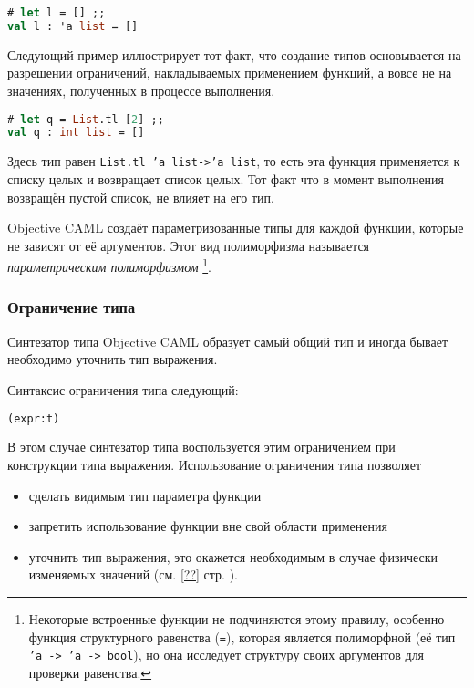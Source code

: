 \begin{lstlisting}[language=OCaml]
# let l = [] ;;
val l : 'a list = []
\end{lstlisting}

Следующий пример иллюстрирует тот факт, что создание типов основывается на
разрешении ограничений, накладываемых применением функций, а вовсе не на
значениях, полученных в процессе выполнения.

\begin{lstlisting}[language=OCaml]
# let q = List.tl [2] ;;
val q : int list = []
\end{lstlisting}

Здесь тип равен \texttt{List.tl 'a list->'a list}, то есть эта функция
применяется к списку целых и возвращает список целых. Тот факт что в момент
выполнения возвращён пустой список, не влияет на его тип.

Objective CAML создаёт параметризованные типы для каждой функции, которые не
зависят от её аргументов. Этот вид полиморфизма называется {\it параметрическим
полиморфизмом} \footnote{Некоторые встроенные функции не подчиняются этому
правилу, особенно функция структурного равенства (\texttt{=}), которая является
полиморфной (её тип \texttt{'a -> 'a -> bool}), но она исследует структуру своих
аргументов для проверки равенства.}.

\subsubsection{Ограничение типа}

Синтезатор типа Objective CAML образует самый общий тип и иногда бывает
необходимо уточнить тип выражения.

Синтаксис ограничения типа следующий:

\begin{lstlisting}[language=OCaml]
(expr:t)
\end{lstlisting}

В этом случае синтезатор типа воспользуется этим ограничением при конструкции
типа выражения. Использование ограничения типа позволяет

\begin{itemize}
	\item сделать видимым тип параметра функции

	\item запретить использование функции вне свой области применения

	\item уточнить тип выражения, это окажется необходимым в случае физически
изменяемых значений (см. \ref{??} стр. \pageref{??}).
\end{itemize}

